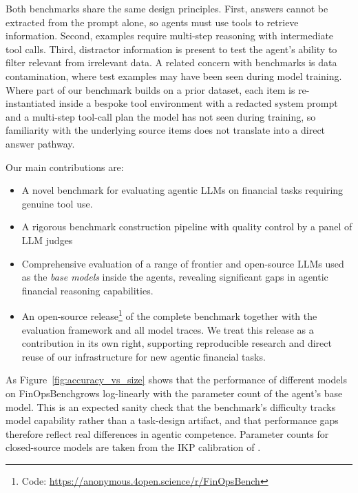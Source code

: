 \documentclass[11pt]{article}
\newcommand{\datasetname}{FinOpsBench}\xspace
\begin{document}
Both benchmarks share the same design principles. First, answers cannot be extracted from the prompt alone, so agents must use tools to retrieve information. Second, examples require multi-step reasoning with intermediate tool calls. Third, distractor information is present to test the agent's ability to filter relevant from irrelevant data. A related concern with benchmarks is data contamination, where test examples may have been seen during model training. Where part of our benchmark builds on a prior dataset, each item is re-instantiated inside a bespoke tool environment with a redacted system prompt and a multi-step tool-call plan the model has not seen during training, so familiarity with the underlying source items does not translate into a direct answer pathway.

Our main contributions are:
\begin{itemize}
    \item A novel benchmark for evaluating agentic LLMs on financial tasks requiring genuine tool use.
    \item A rigorous benchmark construction pipeline with 
    quality control by a panel of LLM judges
    \item Comprehensive evaluation of a range of frontier and open-source LLMs used as the \emph{base models} inside the agents,
    revealing significant gaps in agentic financial reasoning capabilities.
    \item An open-source release\footnote{Code: \url{https://anonymous.4open.science/r/FinOpsBench}} of the complete benchmark together with the evaluation framework and all model traces. We treat this release as a contribution in its own right, supporting reproducible research and direct reuse of our infrastructure for new agentic financial tasks.
\end{itemize}

As Figure~\ref{fig:accuracy_vs_size} shows that the performance of different models on \datasetname grows log-linearly with the parameter count of the agent's base model. This is an expected sanity check that the benchmark's difficulty tracks model capability rather than a task-design artifact, and that performance gaps therefore reflect real differences in agentic competence. Parameter counts for closed-source models are taken from the IKP calibration of \citet{li2026incompressible}.
\end{document}
